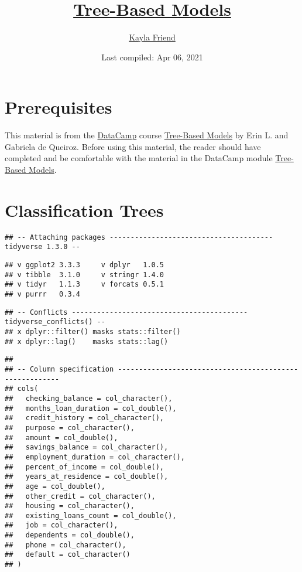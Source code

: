\documentclass[
]{book}
\title{\href{https://learn.datacamp.com/courses/tree-based-models-in-r}{Tree-Based Models}}
\author{\href{https://kaylafriend.github.io/}{Kayla Friend}}
\date{Last compiled: Apr 06, 2021}
\begin{document}
\maketitle

{
\setcounter{tocdepth}{1}
\tableofcontents
}
\hypertarget{prerequisites}{%
\chapter{Prerequisites}\label{prerequisites}}

This material is from the \href{https://www.datacamp.com}{DataCamp} course \href{https://learn.datacamp.com/courses/tree-based-models-in-r}{Tree-Based Models} by Erin L. and Gabriela de Queiroz. Before using this material, the reader should have completed and be comfortable with the material in the DataCamp module \href{https://learn.datacamp.com/courses/tree-based-models-in-r}{Tree-Based Models}.

\hypertarget{classification-trees}{%
\chapter{Classification Trees}\label{classification-trees}}

\begin{verbatim}
## -- Attaching packages --------------------------------------- tidyverse 1.3.0 --
\end{verbatim}

\begin{verbatim}
## v ggplot2 3.3.3     v dplyr   1.0.5
## v tibble  3.1.0     v stringr 1.4.0
## v tidyr   1.1.3     v forcats 0.5.1
## v purrr   0.3.4
\end{verbatim}

\begin{verbatim}
## -- Conflicts ------------------------------------------ tidyverse_conflicts() --
## x dplyr::filter() masks stats::filter()
## x dplyr::lag()    masks stats::lag()
\end{verbatim}

\begin{verbatim}
## 
## -- Column specification --------------------------------------------------------
## cols(
##   checking_balance = col_character(),
##   months_loan_duration = col_double(),
##   credit_history = col_character(),
##   purpose = col_character(),
##   amount = col_double(),
##   savings_balance = col_character(),
##   employment_duration = col_character(),
##   percent_of_income = col_double(),
##   years_at_residence = col_double(),
##   age = col_double(),
##   other_credit = col_character(),
##   housing = col_character(),
##   existing_loans_count = col_double(),
##   job = col_character(),
##   dependents = col_double(),
##   phone = col_character(),
##   default = col_character()
## )
\end{verbatim}
\end{document}
